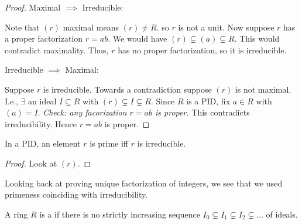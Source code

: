 \documentclass[notes.tex]{subfiles}
\begin{document}
\begin{proof}
	Maximal $\implies$ Irreducible:

	Note that $(r)$ maximal means $(r)\ne R$. so $r$ is not a unit.
	Now suppose $r$ has a proper factorization $r = ab$. We would have $(r)\subsetneq(a)\subsetneq R$. This would contradict maximality. Thus, $r$ has no proper factorization, so it is irreducible.

	Irreducible $\implies$ Maximal:

	Suppose $r$ is irreducible. Towards a contradiction suppose $(r)$ is not maximal. I.e., $\exists \text{ an ideal } I\subseteq R$ with $(r) \subsetneq I \subsetneq R$. Since $R$ is a PID, fix $a\in R$ with $(a) = I$. \emph{Check: any facorization $r = ab$ is proper.}
	This contradicts irreducibility. Hence $r = ab$ is proper.
\end{proof}

\begin{corollary}
	In a PID, an element $r$ is prime iff $r$ is irreducible.
\end{corollary}
\begin{proof}
	Look at $(r)$.
\end{proof}

Looking back at proving unique factorization of integers, we see that we used primeness coinciding with irreducibility.

\begin{defn}
	A ring $R$ is a  if there is no strictly increasing sequence  $I_0\subsetneq I_1\subsetneq I_2\subsetneq \ldots$ of ideals.
\end{defn}
\end{document}
